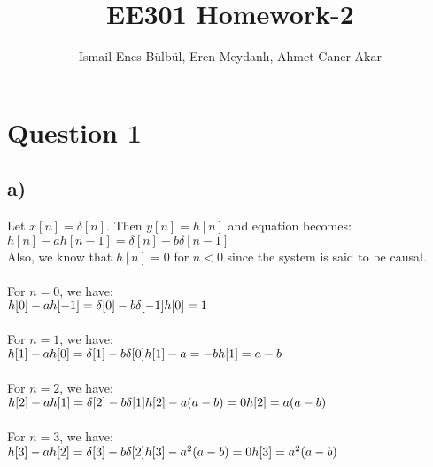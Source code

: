 \documentclass[12pt]{article}
\title{EE301 Homework-2}
\author{İsmail Enes Bülbül, Eren Meydanlı, Ahmet Caner Akar}
\begin{document}
\maketitle


    \section*{Question 1}
    \subsection*{a)}
    Let \(x[n] = \delta[n]\). Then \(y[n] = h[n]\) and equation becomes:\\
    \begin{math}
      h[n] - ah[n-1] = \delta[n] - b\delta[n-1]
    \end{math}\\
    Also, we know that \(h[n] = 0\) for \(n < 0\) since the system is said to be causal.\\ \\
    For \(n = 0\), we have:\\
    \begin{math}
      h[0] - ah[-1] = \delta[0] - b\delta[-1]\\
      h[0] = 1
    \end{math}\\ \\
    For \(n = 1\), we have:\\
    \begin{math}
      h[1] - ah[0] = \delta[1] - b\delta[0]\\
      h[1] - a = -b\\
      h[1] = a - b
    \end{math}\\ \\
    For \(n = 2\), we have:\\
    \begin{math}
      h[2] - ah[1] = \delta[2] - b\delta[1]\\
      h[2] - a(a-b) = 0\\
      h[2] = a(a-b)
    \end{math}\\ \\
    For \(n = 3\), we have:\\
    \begin{math}
      h[3] - ah[2] = \delta[3] - b\delta[2]\\
      h[3] - a^2(a-b) = 0\\
      h[3] = a^2(a-b)
    \end{math}\\ \\
\end{document}
